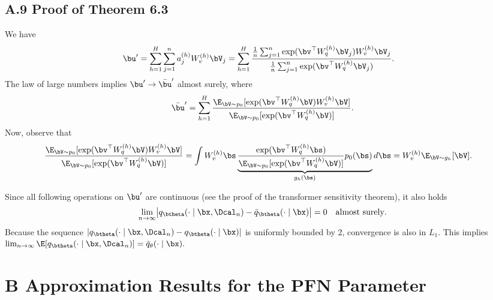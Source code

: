 \documentclass[aspectratio=169,10pt]{beamer}
\newcommand{\currentheading}{\ifx\insertsubsection\empty\insertsection\else\insertsubsection\fi}
\begin{document}
\subsection{A.9 Proof of Theorem 6.3}

\begin{frame}{\currentheading}
\small
We have
\begin{align*}
\bu' = \sum_{h = 1}^H \sum_{j = 1}^{n} a_{j}^{(h)} W_{v}^{(h)} \bV_j
&= \sum_{h = 1}^H \frac{\frac 1 n \sum_{j = 1}^{n} \exp(\bv^\top W_{q}^{(h)} \bV_j) W_{v}^{(h)} \bV_j}{\frac 1 n \sum_{j = 1}^{n} \exp(\bv^\top W_{q}^{(h)} \bV_j) }.
\end{align*}
The law of large numbers implies $\bu' \to \bar \bu'$ almost surely, where
\begin{align*}
	\bar \bu' = 	\sum_{h = 1}^H \frac{\E_{\bV \sim p_0}[\exp(\bv^\top W_{q}^{(h)} \bV)  W_{v}^{(h)} \bV]}{\E_{\bV \sim p_0}[\exp(\bv^\top W_{q}^{(h)} \bV)]}.
\end{align*}
Now, observe that
\begin{align*}
	\frac{\E_{\bV \sim p_0}[\exp(\bv^\top W_{q}^{(h)} \bV)  W_{v}^{(h)} \bV]}{\E_{\bV \sim p_0}[\exp(\bv^\top W_{q}^{(h)} \bV)]}
	&=  \int   W_{v}^{(h)} \bs  \underbrace{\frac{ \exp(\bv^\top W_{q}^{(h)} \bs)}{\E_{\bV \sim p_0}[\exp(\bv^\top W_{q}^{(h)} \bV)]}  p_0(\bs)}_{g_h(\bs)} d\bs  =  W_{v}^{(h)} \E_{\bV \sim g_h}[ \bV].
\end{align*}
\end{frame}

\begin{frame}{\currentheading}
Since all following operations on $\bu'$ are continuous (see the proof of the transformer sensitivity theorem), it also holds
\begin{align*}
	\lim_{n \to \infty} \bigl| q_{\btheta}(\cdot \mid \bx, \Dcal_n) - \bar q_{\btheta}(\cdot \mid \bx) \bigr| = 0 \quad \text{almost surely}.
\end{align*}
Because the sequence $|q_{\btheta}(\cdot \mid \bx, \Dcal_n) - q_{\btheta}(\cdot \mid \bx)|$ is uniformly bounded by 2, convergence is also in $L_1$. This implies $\lim_{n \to \infty} \E[q_{\btheta}(\cdot \mid \bx, \Dcal_n)] = \bar q_{\theta}(\cdot \mid \bx).$
\end{frame}

\section{B Approximation Results for the PFN Parameter}
\end{document}
